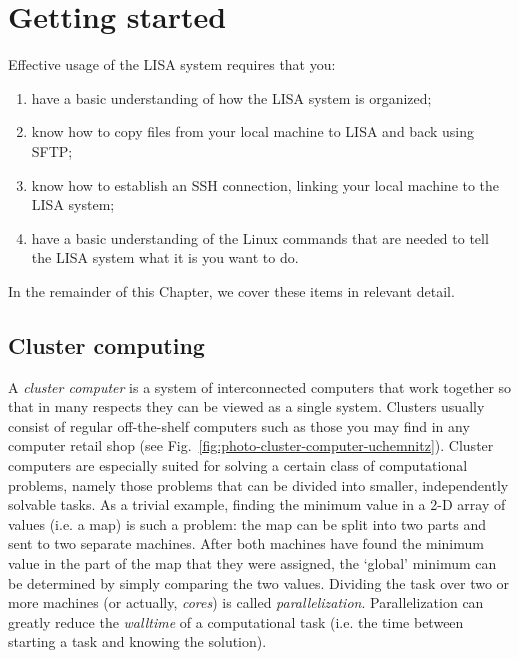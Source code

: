 \chapter{Getting started}
\label{ch:getting-started}

Effective usage of the LISA system requires that you:
\begin{enumerate}
\item{have a basic understanding of how the LISA system is organized;}
\item{know how to copy files from your local machine to LISA and back using SFTP;}
\item{know how to establish an SSH connection, linking your local machine to the LISA system;}
\item{have a basic understanding of the Linux commands that are needed to tell the LISA system what it is you want to do.}
\end{enumerate}

In the remainder of this Chapter, we cover these items in relevant detail.


\section{Cluster computing}

A \textit{cluster computer} is a system of interconnected computers that work together so that in many respects they can be viewed as a single system. Clusters usually consist of regular \mbox{off-the-shelf} computers such as those you may find in any computer retail shop (see Fig.~\ref{fig:photo-cluster-computer-uchemnitz}). Cluster computers are especially suited for solving a certain class of computational problems, namely those problems that can be divided into smaller, independently solvable tasks. As a trivial example, finding the minimum value in a 2-D array of values (i.e. a map) is such a problem: the map can be split into two parts and sent to two separate machines. After both machines have found the minimum value in the part of the map that they were assigned, the `global' minimum can be determined by simply comparing the two values. Dividing the task over two or more machines (or actually, \textit{cores}) is called \textit{parallelization}. Parallelization can greatly reduce the \textit{walltime} of a computational task (i.e. the time between starting a task and knowing the solution).

